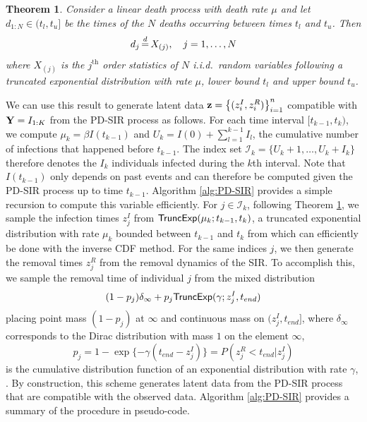 \documentclass[11pt]{article}
\newtheorem{theorem}{Theorem}[section]
\begin{document}
	\begin{theorem}
		\label{theo:ldp}
		Consider a linear death process with death rate $\mu$ and let $d_{1:N} \in (t_l, t_u]$ be the times of the $N$ deaths occurring between times $t_l$ and $t_u$. Then 
		$$d_j \,{\buildrel d \over =}\, X_{(j)}, \quad j = 1, \dots, N$$
		where $X_{(j)}$ is the $j^{\text{th}}$ order statistics of $N$ i.i.d.\ random variables following a truncated exponential distribution with rate $\mu$, lower bound $t_l$ and upper bound $t_u$.
	\end{theorem}
	
	We can use this result to generate latent data  $\mathbf{z} = \left\lbrace (z^I_i, z^R_i)\right\rbrace_{i=1}^{n}$ compatible with $\mathbf{Y} = I_{1:K}$ from the PD-SIR process as follows. For each time interval $[t_{k-1}, t_k)$, we compute $\mu_k = \beta I(t_{k-1})$ and $U_k = I(0) + \sum_{l=1}^{k-1} I_l$, the cumulative number of infections that happened before $t_{k-1}$. The index set $\mathcal{I}_k = \{U_k + 1, \dots, U_k + I_k\}$ therefore denotes the $I_k$ individuals infected during the $k$th interval. Note that $I(t_{k-1})$ only depends on past events and can therefore be computed given the PD-SIR process up to time $t_{k-1}$. Algorithm \ref{alg:PD-SIR} provides a simple recursion to compute this variable efficiently. For $j \in \mathcal{I}_k$, following Theorem \ref{theo:ldp}, we sample the infection times $z^I_j$ from $\textsf{TruncExp}(\mu_k; t_{k-1}, t_k)$, a truncated exponential distribution with rate $\mu_k$ bounded between $t_{k-1}$ and $t_k$ from which can efficiently be done with the inverse CDF method. For the same indices $j$, we then generate the removal times $z^R_j$ from the removal dynamics of the SIR. To accomplish this, we sample the removal time of individual $j$ from the mixed distribution
	$$(1 - p_j) \delta_{\infty} + p_j \textsf{TruncExp}(\gamma; z^I_j, t_{end})$$
	placing point mass $(1 - p_j)$ at $\infty$ and continuous mass on $(z^I_j, t_{end}]$,
	where $\delta_{\infty}$ corresponds to the Dirac distribution with mass $1$ on the element $\infty$,
	$$p_j = 1 - \exp\{-\gamma (t_{end} - z^I_j)\} = P(z^R_j < t_{end} | z^I_j)$$
	is the cumulative distribution function of an exponential distribution with rate $\gamma$, %
	. By construction, this scheme generates latent data from the PD-SIR process that are compatible with the observed data. Algorithm \ref{alg:PD-SIR} provides a summary of the procedure in pseudo-code.
	
\end{document}
